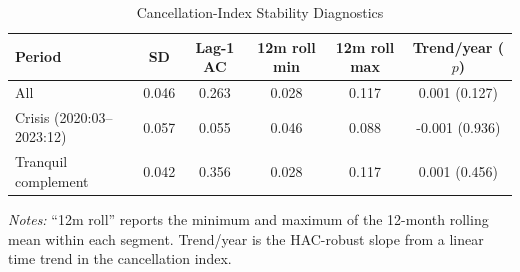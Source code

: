 \begin{table}[htbp]
\centering
\scriptsize
\caption{Cancellation-Index Stability Diagnostics}
\label{tab:cancellation_stability}
\begin{tabular}{lccccc}
\toprule
Period & SD & Lag-1 AC & 12m roll min & 12m roll max & Trend/year ($p$) \\
\midrule
All & 0.046 & 0.263 & 0.028 & 0.117 & 0.001 (0.127) \\
Crisis (2020:03--2023:12) & 0.057 & 0.055 & 0.046 & 0.088 & -0.001 (0.936) \\
Tranquil complement & 0.042 & 0.356 & 0.028 & 0.117 & 0.001 (0.456) \\
\bottomrule
\end{tabular}
\begin{tablenotes}
\footnotesize
\item \textit{Notes:} ``12m roll'' reports the minimum and maximum of the 12-month rolling mean within each segment. Trend/year is the HAC-robust slope from a linear time trend in the cancellation index.
\end{tablenotes}
\end{table}
